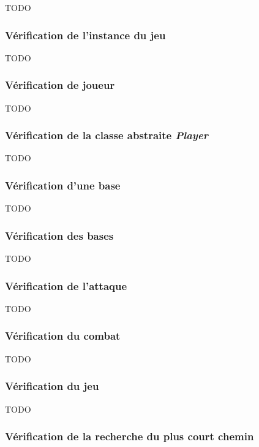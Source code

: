 TODO

\subsubsection{Vérification de l'instance du jeu}

TODO

\subsubsection{Vérification de joueur}

TODO

\subsubsection{Vérification de la classe abstraite \emph{Player}}

TODO

\subsubsection{Vérification d'une base}

TODO

\subsubsection{Vérification des bases}

TODO

\subsubsection{Vérification de l'attaque}

TODO

\subsubsection{Vérification du combat}

TODO

\subsubsection{Vérification du jeu}

TODO

\subsubsection{Vérification de la recherche du plus court chemin}

